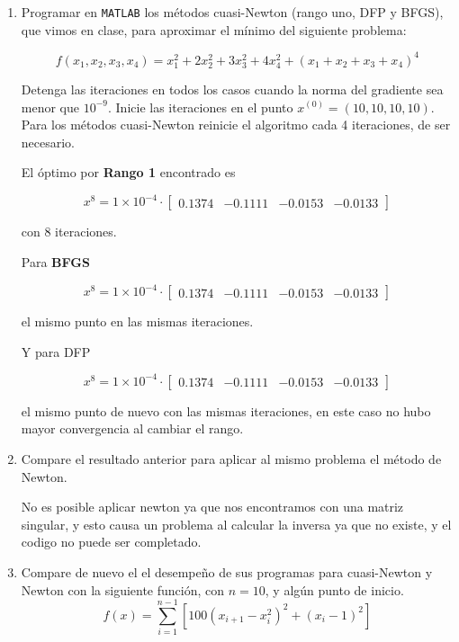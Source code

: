 \documentclass[12pt]{article}
\begin{document}
\begin{enumerate}
    \item Programar en \verb |MATLAB| los métodos cuasi-Newton (rango uno, DFP y BFGS), que vimos en clase, para aproximar el mínimo del siguiente problema:

    \[f(x_1,x_2,x_3,x_4) = x_1^2+2x_2^2+3x_3^2+4x_4^2+(x_1+x_2+x_3+x_4)^4\]

    Detenga las iteraciones en todos los casos cuando la norma del gradiente sea menor que $10^{-9}$. Inicie las iteraciones en el punto $x^{(0)} = (10,10,10,10)$. Para los métodos cuasi-Newton reinicie el algoritmo cada 4 iteraciones, de ser necesario.

    El óptimo por \textbf{Rango 1} encontrado es

    \[x^8 = 1\times 10^{-4} \cdot \begin{bmatrix}
        0.1374 & -0.1111 & -0.0153 & -0.0133
    \end{bmatrix}\]

    con 8 iteraciones.

    Para \textbf{BFGS}

    \[x^8 = 1\times 10^{-4} \cdot \begin{bmatrix}
        0.1374 & -0.1111 & -0.0153 & -0.0133
    \end{bmatrix}\]

    el mismo punto en las mismas iteraciones.

    Y para DFP

    \[x^8 = 1\times 10^{-4} \cdot \begin{bmatrix}
        0.1374 & -0.1111 & -0.0153 & -0.0133
    \end{bmatrix}\]

    el mismo punto de nuevo con las mismas iteraciones, en este caso no hubo mayor convergencia al cambiar el rango.

    \item Compare el resultado anterior para aplicar al mismo problema el método de Newton.
    
    No es posible aplicar newton ya que nos encontramos con una matriz singular, y esto causa un problema al calcular la inversa ya que no existe, y el codigo no puede ser completado.
    \item Compare de nuevo el el desempeño de sus programas para cuasi-Newton y Newton con la siguiente función, con $n=10$, y algún punto de inicio.
    \[f(x) = \sum_{i=1}^{n-1} \left[100(x_{i+1}-x_i^2)^2+(x_i-1)^2\right]\]


\end{enumerate}
\end{document}
